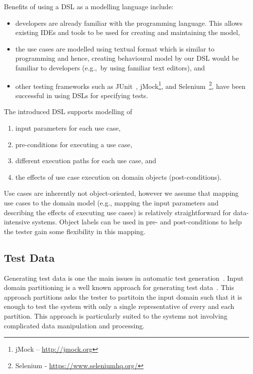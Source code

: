 Benefits of using a DSL as a modelling language include: 
\begin{itemize}
	\item developers are already familiar with the programming language. This allows existing IDEs and tools to be used for creating and maintaining the model,
	
	\item the use cases are modelled using textual format which is similar to programming and hence, creating behavioural model by our DSL would be familiar to developers (e.g.,\ by using familiar text editors), and 
	
	\item other testing frameworks such as JUnit~\cite{Beck2000}, jMock\footnote{ jMock – \url{http://jmock.org}}, and Selenium~\footnote{Selenium - \url{https://www.seleniumhq.org/}}, have been successful in using DSLs for specifying tests.
\end{itemize}

The introduced DSL supports modelling of
\begin{enumerate}
	\item input parameters for each use case,
	
	\item pre-conditions for executing a use case, 
	
	\item different execution paths for each use case, and
	
	\item the effects of use case execution on domain objects (post-conditions).
\end{enumerate}

Use cases are inherently not object-oriented, however we assume that mapping use cases to the domain model (e.g., mapping the input parameters and describing the effects of executing use cases) is relatively straightforward for data-intensive systems. Object labels can be used in pre- and post-conditions to help the tester gain some flexibility in this mapping.

\subsection{Test Data}
\label{sec:framework-overview-test-data}
Generating test data is one the main issues in automatic test generation~\cite{}. Input domain partitioning is a well known approach for generating test data~\cite{Ammann2008}. This approach partitions asks the tester to partitoin the input domain such that it is enough to test the system with only a single representative of every and each partition. This approach is particularly suited to the systems not involving complicated data manipulation and processing. 

